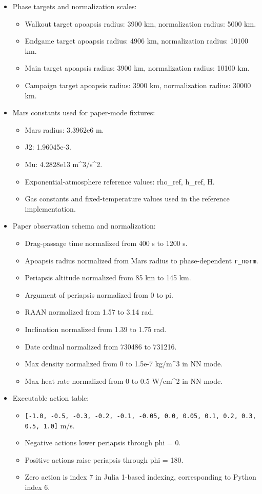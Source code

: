 \documentclass[11pt]{article}
\begin{document}
\begin{itemize}
\item Phase targets and normalization scales:
\begin{itemize}
\item Walkout target apoapsis radius: 3900 km, normalization radius: 5000 km.
\item Endgame target apoapsis radius: 4906 km, normalization radius: 10100 km.
\item Main target apoapsis radius: 3900 km, normalization radius: 10100 km.
\item Campaign target apoapsis radius: 3900 km, normalization radius: 30000 km.

\end{itemize}
\item Mars constants used for paper-mode fixtures:
\begin{itemize}
\item Mars radius: 3.3962e6 m.
\item J2: 1.96045e-3.
\item Mu: 4.2828e13 m\textasciicircum{}3/s\textasciicircum{}2.
\item Exponential-atmosphere reference values: rho\_ref, h\_ref, H.
\item Gas constants and fixed-temperature values used in the reference implementation.

\end{itemize}
\item Paper observation schema and normalization:
\begin{itemize}
\item Drag-passage time normalized from 400 s to 1200 s.
\item Apoapsis radius normalized from Mars radius to phase-dependent \texttt{r\_norm}.
\item Periapsis altitude normalized from 85 km to 145 km.
\item Argument of periapsis normalized from 0 to pi.
\item RAAN normalized from 1.57 to 3.14 rad.
\item Inclination normalized from 1.39 to 1.75 rad.
\item Date ordinal normalized from 730486 to 731216.
\item Max density normalized from 0 to 1.5e-7 kg/m\textasciicircum{}3 in NN mode.
\item Max heat rate normalized from 0 to 0.5 W/cm\textasciicircum{}2 in NN mode.

\end{itemize}
\item Executable action table:
\begin{itemize}
\item \texttt{[-1.0, -0.5, -0.3, -0.2, -0.1, -0.05, 0.0, 0.05, 0.1, 0.2, 0.3, 0.5, 1.0]} m/s.
\item Negative actions lower periapsis through phi = 0.
\item Positive actions raise periapsis through phi = 180.
\item Zero action is index 7 in Julia 1-based indexing, corresponding to Python index 6.


\end{itemize}
\end{itemize}
\end{document}
